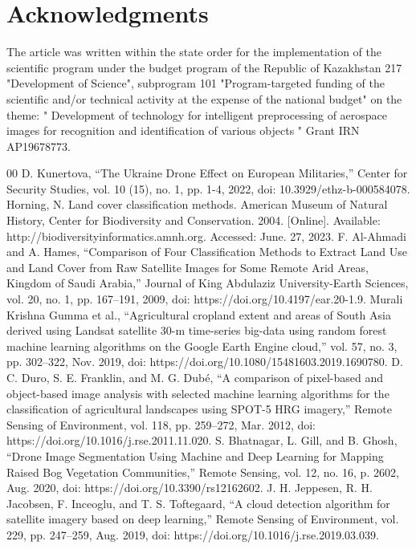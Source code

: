 \documentclass[conference]{IEEEtran}
\begin{document}
\section{Acknowledgments}

The article was written within the state order for the implementation of the scientific program under the budget program of the Republic of Kazakhstan 217 "Development of Science", subprogram 101 "Program-targeted funding of the scientific and/or technical activity at the expense of the national budget" on the theme: " Development of technology for intelligent preprocessing of aerospace images for recognition and identification of various objects " Grant IRN AP19678773.

\begin{thebibliography}{00}
 D. Kunertova, “The Ukraine Drone Effect on European Militaries,” Center for Security Studies, vol. 10 (15), no. 1, pp. 1-4, 2022, doi: 10.3929/ethz-b-000584078.
 Horning, N. Land cover classification methods. American Museum of Natural History, Center for Biodiversity and Conservation. 2004. [Online]. Available: http://biodiversityinformatics.amnh.org. Accessed: June. 27, 2023.
 F. Al-Ahmadi and A. Hames, “Comparison of Four Classification Methods to Extract Land Use and Land Cover from Raw Satellite Images for Some Remote Arid Areas, Kingdom of Saudi Arabia,” Journal of King Abdulaziz University-Earth Sciences, vol. 20, no. 1, pp. 167–191, 2009, doi: https://doi.org/10.4197/ear.20-1.9.
 Murali Krishna Gumma et al., “Agricultural cropland extent and areas of South Asia derived using Landsat satellite 30-m time-series big-data using random forest machine learning algorithms on the Google Earth Engine cloud,” vol. 57, no. 3, pp. 302–322, Nov. 2019, doi: https://doi.org/10.1080/15481603.2019.1690780.
 D. C. Duro, S. E. Franklin, and M. G. Dubé, “A comparison of pixel-based and object-based image analysis with selected machine learning algorithms for the classification of agricultural landscapes using SPOT-5 HRG imagery,” Remote Sensing of Environment, vol. 118, pp. 259–272, Mar. 2012, doi: https://doi.org/10.1016/j.rse.2011.11.020.
 S. Bhatnagar, L. Gill, and B. Ghosh, “Drone Image Segmentation Using Machine and Deep Learning for Mapping Raised Bog Vegetation Communities,” Remote Sensing, vol. 12, no. 16, p. 2602, Aug. 2020, doi: https://doi.org/10.3390/rs12162602.
 J. H. Jeppesen, R. H. Jacobsen, F. Inceoglu, and T. S. Toftegaard, “A cloud detection algorithm for satellite imagery based on deep learning,” Remote Sensing of Environment, vol. 229, pp. 247–259, Aug. 2019, doi: https://doi.org/10.1016/j.rse.2019.03.039.

\end{thebibliography}
\end{document}
